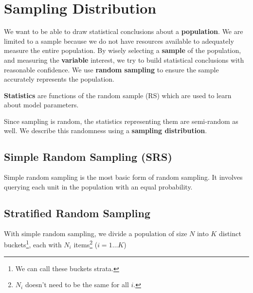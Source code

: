         \chapter{Sampling Distribution} %
        \label{cha:sampling_distribution}
            We want to be able to draw statistical conclusions about a \textbf{population}.
            We are limited to a sample because we do not have resources available to adequately measure the entire population.
            By wisely selecting a \textbf{sample} of the population, and measuring the \textbf{variable} interest, we try to build statistical conclusions with reasonable confidence.
            We use \textbf{random sampling} to ensure the sample accurately represents the population.

            \textbf{Statistics} are functions of the random sample (RS) which are used to learn about model parameters.

            Since sampling is random, the statistics representing them are semi-random as well.
            We describe this randomness using a \textbf{sampling distribution}.
            \section{Simple Random Sampling (SRS)} %
            \label{sec:simple_random_sampling_srs}
                Simple random sampling is the most basic form of random sampling.
                It involves querying each unit in the population with an equal probability.
            \section{Stratified Random Sampling} %
            \label{sec:stratified_random_sampling}
                With simple random sampling, we divide a population of size $N$ into $K$ distinct buckets\footnote{We can call these buckets strata.}, each with $N_i$ items\footnote{$N_i$ doesn't need to be the same for all $i$.} ($i = 1 \ldots K$)

